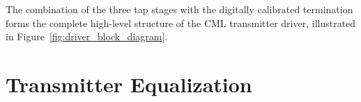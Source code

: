 The combination of the three tap stages with the digitally calibrated termination forms the complete high-level structure of the CML transmitter driver, illustrated in Figure~\ref{fig:driver_block_diagram}.

\section{Transmitter Equalization} \label{sec:tx_equalization}


